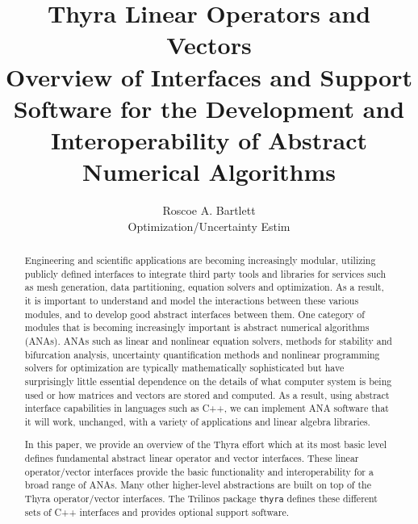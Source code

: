 \documentclass[pdf,ps2pdf,11pt]{SANDreport}
\title{\center
Thyra Linear Operators and Vectors\\[2ex]
{\Large Overview of Interfaces and Support Software for
the Development and Interoperability of Abstract Numerical Algorithms}}
\author{
Roscoe A. Bartlett \\ Optimization/Uncertainty Estim}
\date{}
\begin{document}
\maketitle

%

%
\begin{abstract}
%
Engineering and scientific applications are becoming increasingly modular,
utilizing publicly defined interfaces to integrate third party tools and
libraries for services such as mesh generation, data partitioning, equation
solvers and optimization.  As a result, it is important to understand and
model the interactions between these various modules, and to develop good
abstract interfaces between them.  One category of modules that is becoming
increasingly important is abstract numerical algorithms (ANAs).  ANAs such as
linear and nonlinear equation solvers, methods for stability and bifurcation
analysis, uncertainty quantification methods and nonlinear programming solvers
for optimization are typically mathematically sophisticated but have
surprisingly little essential dependence on the details of what computer
system is being used or how matrices and vectors are stored and computed.  As
a result, using abstract interface capabilities in languages such as C++, we
can implement ANA software that it will work, unchanged, with a variety of
applications and linear algebra libraries.

In this paper, we provide an overview of the Thyra effort which at its most
basic level defines fundamental abstract linear operator and vector
interfaces.  These linear operator/vector interfaces provide the basic
functionality and interoperability for a broad range of ANAs.  Many other
higher-level abstractions are built on top of the Thyra operator/vector
interfaces. The Trilinos package {}\texttt{thyra} defines these different sets
of C++ interfaces and provides optional support software.
%
\end{abstract}
%

%
\clearpage
\end{document}

